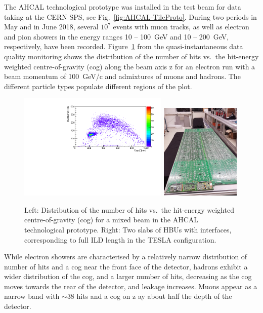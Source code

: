 The AHCAL technological prototype was installed in the test beam for data taking at the CERN SPS, see Fig.~\ref{fig:AHCAL-TileProto}.
During two periods in May and in June 2018, several $10^7$ events with muon tracks, as well as electron and pion showers in the energy ranges  10 -- 100~GeV and 10 -- 200~GeV, respectively, have been recorded. 
Figure~\ref{fig:AHCAL-nhit-longslab} from the quasi-instantaneous data quality monitoring shows the distribution of the number of hits vs.\ the hit-energy weighted centre-of-gravity (cog) along the beam axis z for an electron run with a beam momentum of 100~GeV/c and admixtures of muons and hadrons. The different particle types populate different regions of the plot.
\begin{figure}[hbt]
\centering
\includegraphics[width=0.64\textwidth]{Detector/fig/AHCAL-cogz_nhits.pdf}
\includegraphics[width=0.34\textwidth]{Detector/fig/AHCAL-LomgSlab.jpeg}
\caption{Left: Distribution of the number of hits vs.\ the hit-energy weighted centre-of-gravity (cog) for a mixed beam in the AHCAL technological prototype. Right: Two slabs of HBUs with interfaces, corresponding to full ILD length in the TESLA configuration.} 
\label{fig:AHCAL-nhit-longslab}
\end{figure}
%
While electron showers are characterised by a relatively narrow distribution of number of hits and a cog near the front face of the detector, hadrons exhibit a wider distribution of the cog, and a larger number of hits, decreasing as the cog moves towards the rear of the detector, and leakage increases.
Muons appear as a narrow band with $\sim 38$ hits and a cog on z ay about half the depth of the detector. 

